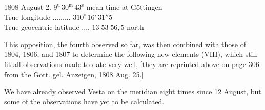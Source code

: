 \begin{center}
1808 August 2. $9^{\text{u}}\,30^{\text{m}}\,43^{\text{s}}$ mean time at Göttingen\\
True longitude .\;.\;.\;.\;.\;.\;.\;.\;.\; $310^\circ\,16'\,31''5$\\
True geocentric latitude .\;.\;.\;.\; $13\;53\;56,5$ north \end{center}

\par\indent This opposition, the fourth observed so far, was then combined with those of 1804, 1806, and 1807 to determine the following new elements (VIII), which still fit all observations made to date very well, [they are reprinted above on page 306 from the Gött. gel. Anzeigen, 1808 Aug. 25.]

\par\indent We have already observed Vesta on the meridian eight times since 12 August, but some of the observations have yet to be calculated.

\par{}
